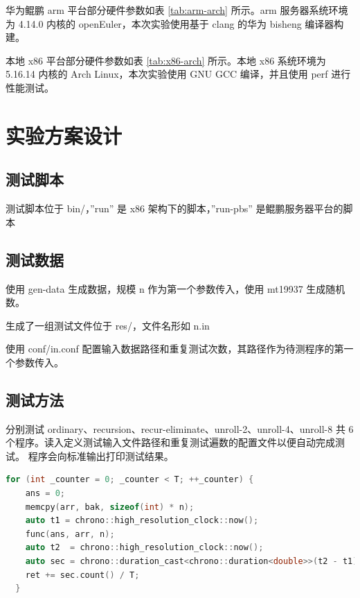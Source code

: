 \documentclass[a4paper]{article}
\begin{document}
华为鲲鹏 arm 平台部分硬件参数如表 \ref{tab:arm-arch} 所示。arm 服务器系统环境为 4.14.0 内核的 openEuler，本次实验使用基于 clang 的华为 bisheng 编译器构建。

本地 x86 平台部分硬件参数如表 \ref{tab:x86-arch} 所示。本地 x86 系统环境为 5.16.14 内核的 Arch Linux，本次实验使用 GNU GCC 编译，并且使用 perf 进行性能测试。

\section{实验方案设计}
\subsection{测试脚本}
测试脚本位于 bin/，''run'' 是 x86 架构下的脚本，''run-pbs'' 是鲲鹏服务器平台的脚本

\subsection{测试数据}
使用 gen-data 生成数据，规模 n 作为第一个参数传入，使用 mt19937 生成随机数。

生成了一组测试文件位于 res/，文件名形如 n.in

使用 conf/in.conf 配置输入数据路径和重复测试次数，其路径作为待测程序的第一个参数传入。

\subsection{测试方法}
分别测试 ordinary、recursion、recur-eliminate、unroll-2、unroll-4、unroll-8 共 6 个程序。读入定义测试输入文件路径和重复测试遍数的配置文件以便自动完成测试。
程序会向标准输出打印测试结果。

\begin{lstlisting}[title=重复测试代码,frame=trbl,language={C++}]
  for (int _counter = 0; _counter < T; ++_counter) {
    ans = 0;
    memcpy(arr, bak, sizeof(int) * n);
    auto t1 = chrono::high_resolution_clock::now();
    func(ans, arr, n);
    auto t2  = chrono::high_resolution_clock::now();
    auto sec = chrono::duration_cast<chrono::duration<double>>(t2 - t1);
    ret += sec.count() / T;
  }
\end{lstlisting}
\end{document}

